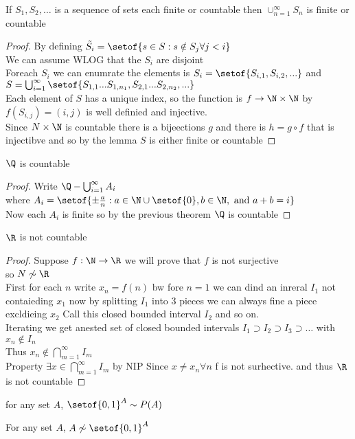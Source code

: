 \documentclass[answers,12pt,addpoints]{exam}
\begin{document}
\begin{theorem}
    If $S_1, S_2, \dots$ is a sequence of sets each finite or countable then $\cup_{n=1}^\infty S_n$ is finite or countable
    \begin{proof}
        By defining $\tilde{S_i} = \setof{s \in S: s \notin S_j \forall j < i}$ \\
        We can assume WLOG that the $S_i$ are disjoint \\
        Foreach $S_i$ we can enumrate the elements is $S_i = \setof{S_{i,1}, S_{i,2}, ...}$ and $S = \bigcup_{i=1}^\infty \setof{S_{1,1}... S_{1,n_1}, S_{2,1}... S_{2,n_2}, ...}$ \\
        Each element of $S$ has a unique index, so the function is $f \to \N \times \N$ by $f(S_{i,j}) = (i,j)$ is well definied and injective. \\
        Since $N \times \N$ is countable there is a bijeections $g$ and there is $h = g \circ f$ that is injectibve and so by the lemma $S$ is either finite or countable
    \end{proof}
\end{theorem}
\begin{theorem}
    $\Q$ is countable
    \begin{proof}
        Write $\Q - \bigcup_{i=1}^\infty A_i$\\
        where $A_i = \setof{\pm \frac{a}{n}: a\in \N\cup\setof{0}, b \in \N, \text{ and } a+b = i}$\\
        Now each $A_i$ is finite so by the previous theorem $\Q$ is countable
    \end{proof}
\end{theorem}
\begin{theorem}
    $\R$ is not countable
    \begin{proof}
        Suppose $f: \N \to \R$ we will prove that $f$ is not surjective \\
        so $N \not \sim \R$ \\
        First for each $n$ write $x_n = f(n)$ bw fore $n=1$ we can dind an inreral $I_1$ not contaieding $x_1$ now by splitting $I_1$ into 3 pieces we can always fine a piece excldieing $x_2$ Call this closed bounded interval $I_2$ and so on. \\
        Iterating we get anested set of closed bounded intervals $I_1 \supset I_2 \supset I_3 \supset \dots$ with $x_n \notin I_n$ \\
        Thus $x_n \notin \bigcap_{m=1}^\infty I_m$ \\
        Property $\exists x \in \bigcap_{m=1}^\infty I_m$ by NIP
        Since $x \neq x_n \forall n$ f is not surhective. and thus $\R$ is not countable

    \end{proof}
\end{theorem}
\begin{theorem}
    
\end{theorem}
\begin{theorem}
    for any set $A$, $\setof{0,1}^A \sim P(A)$
\end{theorem}
\begin{theorem}
    For any set $A$, $A \not \sim \setof{0,1}^A$
\end{theorem}
\end{document}
